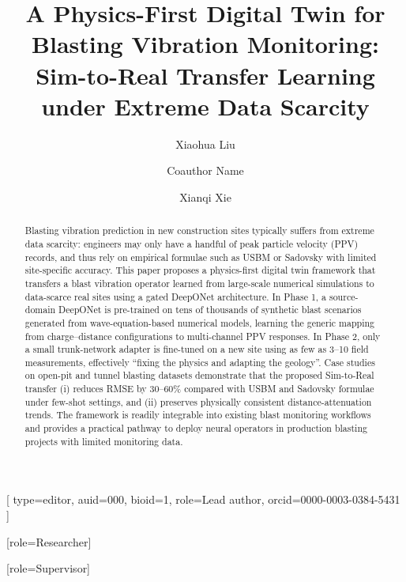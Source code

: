 \documentclass[a4paper,fleqn]{cas-sc}
\begin{document}
\let\WriteBookmarks\relax
\def\floatpagepagefraction{1}
\def\textpagefraction{.001}



\title [mode = title]{A Physics-First Digital Twin for Blasting Vibration Monitoring: Sim-to-Real Transfer Learning under Extreme Data Scarcity}

\author[1]{Xiaohua Liu}[%
    type=editor,
    auid=000, bioid=1,
    role=Lead author,
    orcid=0000-0003-0384-5431
]
\cormark[1]

\author[2]{Coauthor Name}[role=Researcher]

\author[1]{Xianqi Xie}[role=Supervisor]




\begin{abstract}
Blasting vibration prediction in new construction sites typically suffers from extreme data scarcity: engineers may only have a handful of peak particle velocity (PPV) records, and thus rely on empirical formulae such as USBM or Sadovsky with limited site-specific accuracy. This paper proposes a physics-first digital twin framework that transfers a blast vibration operator learned from large-scale numerical simulations to data-scarce real sites using a gated DeepONet architecture. In Phase 1, a source-domain DeepONet is pre-trained on tens of thousands of synthetic blast scenarios generated from wave-equation-based numerical models, learning the generic mapping from charge–distance configurations to multi-channel PPV responses. In Phase 2, only a small trunk-network adapter is fine-tuned on a new site using as few as 3--10 field measurements, effectively ``fixing the physics and adapting the geology''. Case studies on open-pit and tunnel blasting datasets demonstrate that the proposed Sim-to-Real transfer (i) reduces RMSE by 30--60\% compared with USBM and Sadovsky formulae under few-shot settings, and (ii) preserves physically consistent distance-attenuation trends. The framework is readily integrable into existing blast monitoring workflows and provides a practical pathway to deploy neural operators in production blasting projects with limited monitoring data.
\end{abstract}
\end{document}
